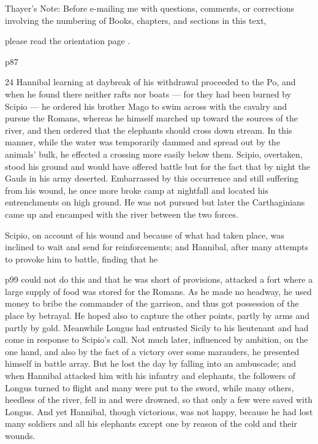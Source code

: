 Thayer's Note: Before e-mailing me with questions, comments, or corrections involving the numbering of Books, chapters, and sections in this text,

please read the orientation page .

p87

24
Hannibal learning at daybreak of his withdrawal proceeded to the Po, and when he found there neither rafts nor boats \texthebrew{—} for they had been burned by Scipio \texthebrew{—} he ordered his brother Mago to swim across with the cavalry and pursue the Romans, whereas he himself marched up toward the sources of the river, and then ordered that the elephants should cross down stream. In this manner, while the water was temporarily dammed and spread out by the animals' bulk, he effected a crossing more easily below them. Scipio, overtaken, stood his ground and would have offered battle but for the fact that by night the Gauls in his army deserted. Embarrassed by this occurrence and still suffering from his wound, he once more broke camp at nightfall and located his entrenchments on high ground. He was not pursued but later the Carthaginians came up and encamped with the river between the two forces.

Scipio, on account of his wound and because of what had taken place, was inclined to wait and send for reinforcements; and Hannibal, after many attempts to provoke him to battle, finding that he

p99 could not do this and that he was short of provisions, attacked a fort where a large supply of food was stored for the Romans. As he made no headway, he used money to bribe the commander of the garrison, and thus got possession of the place by betrayal. He hoped also to capture the other points, partly by arms and partly by gold. Meanwhile Longus had entrusted Sicily to his lieutenant and had come in response to Scipio's call. Not much later, influenced by ambition, on the one hand, and also by the fact of a victory over some marauders, he presented himself in battle array. But he lost the day by falling into an ambuscade; and when Hannibal attacked him with his infantry and elephants, the followers of Longus turned to flight and many were put to the sword, while many others, heedless of the river, fell in and were drowned, so that only a few were saved with Longus. And yet Hannibal, though victorious, was not happy, because he had lost many soldiers and all his elephants except one by reason of the cold and their wounds.

